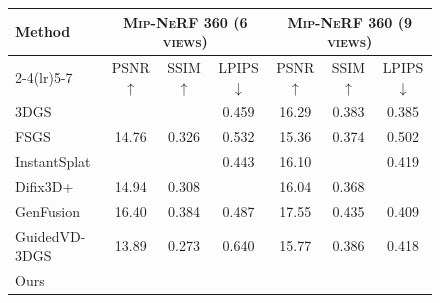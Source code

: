 \documentclass[runningheads]{llncs}
\begin{document}
\begin{figure}[t]
\centering
\vspace{-2mm}

\begin{minipage}{\linewidth}
\centering
\scriptsize
\setlength{\tabcolsep}{4.5pt}
\renewcommand{\arraystretch}{0.9}

\label{tab:mipnerf360_6_9_colored}

\begin{tabular}{lccc ccc}
\toprule
\multirow{2}{*}{Method} 
& \multicolumn{3}{c}{\textsc{Mip-NeRF 360 (6 views)}}
& \multicolumn{3}{c}{\textsc{Mip-NeRF 360 (9 views)}} \\
\cmidrule(lr){2-4}\cmidrule(lr){5-7}
 & PSNR $\uparrow$ & SSIM $\uparrow$ & LPIPS $\downarrow$
 & PSNR $\uparrow$ & SSIM $\uparrow$ & LPIPS $\downarrow$ \\
\midrule


3DGS 
& \cellcolor{yellow!25}{15.30} & \cellcolor{yellow!25}{0.342} & 0.459
& \cellcolor{orange!25}16.29 & \cellcolor{yellow!25}0.383 & \cellcolor{yellow!25}0.385 \\

FSGS 
& 14.76 & 0.326 & 0.532
& 15.36 & 0.374 & 0.502 \\

InstantSplat 
& \cellcolor{orange!25}{15.91} & \cellcolor{orange!25}{0.388} & \cellcolor{yellow!25}0.443
& \cellcolor{yellow!25}16.10 & \cellcolor{orange!25}{0.433} & 0.419 \\


Difix3D+ 
& 14.94 & 0.308 & \cellcolor{red!25}{0.419}
& 16.04 & 0.368 & \cellcolor{red!25}{0.371} \\


GenFusion & 16.40 & 0.384 & 0.487 & 17.55 & 0.435 & 0.409 \\

GuidedVD-3DGS
& 13.89 & 0.273 & 0.640
& 15.77 & 0.386 & 0.418 \\

Ours 
& \cellcolor{red!25}{16.74} & \cellcolor{red!25}{0.393} & \cellcolor{orange!25}{0.436}
& \cellcolor{red!25}{17.56} & \cellcolor{red!25}{0.448} & \cellcolor{orange!25}{0.381} \\


\end{tabular}
\end{minipage}
\end{figure}
\end{document}
